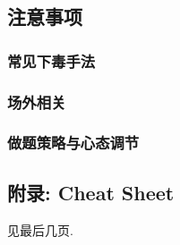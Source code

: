 \documentclass[a4paper]{article}
\begin{document}
\begin{multicols}{2}
				\subsection{注意事项}

					\subsubsection{常见下毒手法}
						

					\subsubsection{场外相关}
						

					\subsubsection{做题策略与心态调节}
						
				
				\subsection{附录: Cheat Sheet}
					见最后几页.

	\end{multicols}

	
\end{document}
